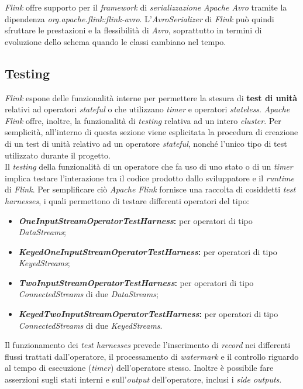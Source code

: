 \label{sec:avro}
\textit{Flink} offre supporto per il \textit{\textit{\gls{framework}}} di \textit{\gls{serializzazione}} \textit{Apache Avro} tramite la dipendenza \textit{org.apache.flink:flink-avro}. L'\textit{AvroSerializer} di \textit{Flink} può quindi sfruttare le prestazioni e la flessibilità di \textit{Avro}, soprattutto in termini di evoluzione dello schema quando le classi cambiano nel tempo.

\subsection{Testing}\label{sec:flink-testing}
\textit{Flink} espone delle funzionalità interne per permettere la stesura di \textbf{test di unità} relativi ad operatori \textit{\gls{stateful}} o che utilizzano \textit{timer} e operatori \textit{\gls{stateless}}. \textit{Apache Flink} offre, inoltre, la funzionalità di \textit{testing} relativa ad un intero \textit{\gls{cluster}}. Per semplicità, all'interno di questa sezione viene esplicitata la procedura di creazione di un test di unità relativo ad un operatore \textit{\gls{stateful}}, nonché l'unico tipo di test utilizzato durante il progetto.\\
Il \textit{testing} della funzionalità di un operatore che fa uso di uno stato o di un \textit{timer} implica testare l'interazione tra il codice prodotto dallo sviluppatore e il \textit{runtime} di \textit{Flink}. Per semplificare ciò \textit{Apache Flink} fornisce una raccolta di cosiddetti \textit{test harnesses}, i quali permettono di testare differenti operatori del tipo:
\begin{itemize}
	\item{\textbf{\textit{OneInputStreamOperatorTestHarness}:} per operatori di tipo \textit{DataStreams};}
	\item{\textbf{\textit{KeyedOneInputStreamOperatorTestHarness}:} per operatori di tipo \textit{KeyedStreams};}
	\item{\textbf{\textit{TwoInputStreamOperatorTestHarness}:} per operatori di tipo \textit{ConnectedStreams} di due \textit{DataStreams};}
	\item{\textbf{\textit{KeyedTwoInputStreamOperatorTestHarness}:} per operatori di tipo \textit{ConnectedStreams} di due \textit{KeyedStreams}.}
\end{itemize}

Il funzionamento dei \textit{test harnesses} prevede l'inserimento di \textit{record} nei differenti flussi trattati dall'operatore, il processamento di \textit{watermark} e il controllo riguardo al tempo di esecuzione (\textit{timer}) dell'operatore stesso. Inoltre è possibile fare asserzioni sugli stati interni e sull'\textit{output} dell'operatore, inclusi i \textit{side outputs}. 




